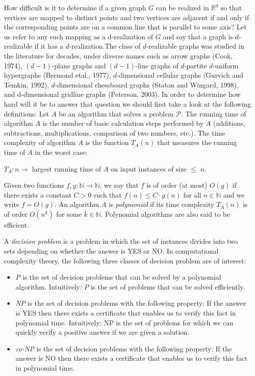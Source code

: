 \documentclass[12pt,a4paper,titlepage,openany]{report}
\begin{document}
How difficult is it to determine if
a given graph $G$ can be realized in $\mathbb{R}^d$ so that vertices are mapped to distinct points and two vertices are adjacent if and only if the corresponding points are on a common line that is parallel to some axis? Let us refer to any such mapping as a d-realization of $G$ and say that a graph is $d$-realizable if it has a $d$-realization.The class of $d$-realizable graphs was studied
in the literature for decades, under diverse names such as arrow graphs (Cook, 1974), $(d - 1)$-plane graphs and $(d -1)$-line graphs of $d$-partite $d$-uniform hypergraphs (Bermond etal., 1977), $d$-dimensional cellular graphs (Gurvich and Temkin, 1992), $d$-dimensional chessboard graphs (Staton and  Wingard, 1998), and d-dimensional gridline graphs (Peterson, 2003).\newline
In order to determine how hard will it be to answer that question we should first take a look at the following definitions:\newline
Let $A$ be an algorithm that solves a problem $\mathcal{P}$. The running time of algorithm $A$ is the number of basic calculation steps performed by $A$ (additions, subtractions, multiplications, comparison of two numbers, etc.). The time complexity of algorithm $A$ is the function $T_A(n)$ that
measures the running time of $A$ in the worst case:
\begin{center}
	$T_A : n \rightarrow $ largest running time of $A$ on input instances of size $\leq$ $n$.
\end{center} 

Given two functions $f,g : \mathbb{N} \to \mathbb{N}$, we say that $f$ is of order (at most) $O(g)$ if there exists a constant $C > 0$ such that $f(n) \leq C\cdot g(n)$ for all $n \in \mathbb{N}$ and we write $f = O(g)$.\newline
An algorithm $A$ is \textit{polynomial} if its time complexity $T_A(n)$ is of order $O(n^k)$ for some $k \in \mathbb{N}$.
Polynomial algorithms are also said to be efficient.

A \textit{decision problem} is a problem in which the set of instances divides into two sets depending on whether the answer is YES or NO.
In computational complexity theory, the following three classes of decision problem are of interest:
\begin{itemize}
\item {\it P} is the set of decision problems that can be solved by a polynomial algorithm. Intuitively: $P$ is the set of problems that can be solved efficiently.
\item {\it NP} is the set of decision problems with the following property:
If the answer is YES then there exists a certificate that
enables us to verify this fact in polynomial time. Intuitively: NP is the set of problems for which we can
quickly verify a positive answer if we are given a solution.
\item {\it co-NP} is the set of decision problems with the following property:
If the answer is NO then there exists a certificate that
enables us to verify this fact in polynomial time.
\end{itemize}
\end{document}
